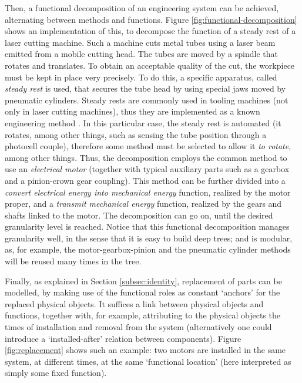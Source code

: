 \documentclass[
]{ceurart}
\begin{document}
Then, a functional decomposition of an engineering system can be achieved, alternating between methods and functions. Figure \ref{fig:functional-decomposition} shows an implementation of this, to decompose the function of a steady rest of a laser cutting machine.
Such a machine cuts metal tubes using a laser beam emitted from a mobile cutting head. The tubes are moved by a spindle that rotates and translates. To obtain an acceptable quality of the cut, the workpiece must be kept in place very precisely. To do this, a specific apparatus, called \textit{steady rest} is used, that secures the tube head by using special jaws moved by pneumatic cylinders. %
Steady rests are commonly used in tooling machines (not only in laser cutting machines), thus they are implemented as a known engineering method%
. In this particular case, the steady rest is automated (it rotates, among other things, such as sensing the tube position through a photocell couple), therefore some method must be selected to allow it \textit{to rotate}, among other things. Thus, the decomposition employs the common method to use an \textit{electrical motor} (together with typical auxiliary parts such as a gearbox and a pinion-crown gear coupling). This method can be further divided into a \textit{convert electrical energy into mechanical energy} function, realized by the motor proper, and a \textit{transmit mechanical energy} function, realized by the gears and shafts linked to the motor. The decomposition can go on, until the desired granularity level is reached. 
Notice that this functional decomposition manages granularity well, in the sense that it is easy to build deep trees; and is modular, as, for example, the motor-gearbox-pinion and the pneumatic cylinder methods will be reused many times in the tree.

Finally, as explained in Section \ref{subsec:identity}, replacement of parts can be modelled, by making use of the functional roles as constant `anchors' for the replaced physical objects. It suffices a link between physical objects and functions, together with, for example, attributing to the physical objects the times of installation and removal from the system (alternatively one could introduce a `installed-after' relation between components). Figure \ref{fig:replacement} shows such an example: two motors are installed in the same system, at different times, at the same `functional location' (here interpreted as simply some fixed function).
\end{document}
